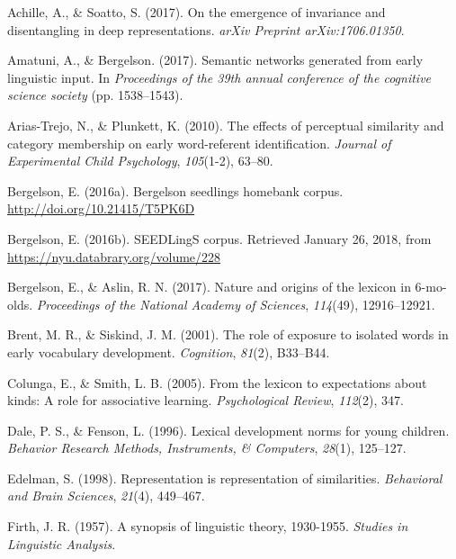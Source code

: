 \documentclass[10pt, letterpaper]{article}
\begin{document}
\setlength{\parindent}{-0.1in} \setlength{\leftskip}{0.125in} \noindent

\hypertarget{refs}{}
\hypertarget{ref-achille2017emergence}{}
Achille, A., \& Soatto, S. (2017). On the emergence of invariance and
disentangling in deep representations. \emph{arXiv Preprint
arXiv:1706.01350}.

\hypertarget{ref-amatuni2017semantic}{}
Amatuni, A., \& Bergelson. (2017). Semantic networks generated from
early linguistic input. In \emph{Proceedings of the 39th annual
conference of the cognitive science society} (pp. 1538--1543).

\hypertarget{ref-arias2010effects}{}
Arias-Trejo, N., \& Plunkett, K. (2010). The effects of perceptual
similarity and category membership on early word-referent
identification. \emph{Journal of Experimental Child Psychology},
\emph{105}(1-2), 63--80.

\hypertarget{ref-bergelson2016seedlings}{}
Bergelson, E. (2016a). Bergelson seedlings homebank corpus.
\url{http://doi.org/10.21415/T5PK6D}

\hypertarget{ref-bergelson2016seedlingsdatabrary}{}
Bergelson, E. (2016b). SEEDLingS corpus. Retrieved January 26, 2018,
from \url{https://nyu.databrary.org/volume/228}

\hypertarget{ref-bergelson2017nature}{}
Bergelson, E., \& Aslin, R. N. (2017). Nature and origins of the lexicon
in 6-mo-olds. \emph{Proceedings of the National Academy of Sciences},
\emph{114}(49), 12916--12921.

\hypertarget{ref-brent2001role}{}
Brent, M. R., \& Siskind, J. M. (2001). The role of exposure to isolated
words in early vocabulary development. \emph{Cognition}, \emph{81}(2),
B33--B44.

\hypertarget{ref-colunga2005lexicon}{}
Colunga, E., \& Smith, L. B. (2005). From the lexicon to expectations
about kinds: A role for associative learning. \emph{Psychological
Review}, \emph{112}(2), 347.

\hypertarget{ref-dale1996lexical}{}
Dale, P. S., \& Fenson, L. (1996). Lexical development norms for young
children. \emph{Behavior Research Methods, Instruments, \& Computers},
\emph{28}(1), 125--127.

\hypertarget{ref-edelman1998representation}{}
Edelman, S. (1998). Representation is representation of similarities.
\emph{Behavioral and Brain Sciences}, \emph{21}(4), 449--467.

\hypertarget{ref-firth1957synopsis}{}
Firth, J. R. (1957). A synopsis of linguistic theory, 1930-1955.
\emph{Studies in Linguistic Analysis}.
\end{document}
